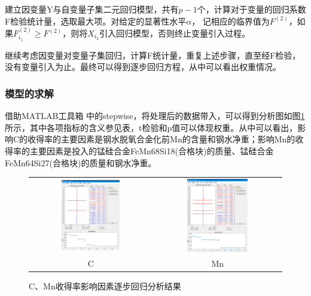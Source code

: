 \documentclass[12pt]{article}%
\begin{document}
建立因变量Y与自变量子集二元回归模型，共有$p-1$个，计算对于变量的回归系数F检验统计量，选取最大项。对给定的显著性水平$\alpha$，
记相应的临界值为$F^{(2)}$，如果$F^{(2)}_{i_1}\geq F^{(2)}$，则将$X_{i_2}$引入回归模型，否则终止变量引入过程。

继续考虑因变量对变量子集回归，计算F统计量，重复上述步骤，直至经F检验，没有变量引入为止。最终可以得到逐步回归方程，从中可以看出权重情况。
\subsubsection{模型的求解}
借助MATLAB工具箱 中的stepwise，将处理后的数据带入，可以得到分析图如图\ref{zhubuhuiguifenxi}所示，其中各项指标的含义参见表，t检验和p值可以体现权重。从中可以看出，影响C的收得率的主要因素是钢水脱氧合金化前Mn的含量和钢水净重；影响Mn的收得率的主要因素是投入的锰硅合金FeMn68Si18(合格块)的质量、锰硅合金FeMn64Si27(合格块)的质量和钢水净重。
 \begin{figure}
  \centering
  \begin{tabular}{cc}
  \includegraphics[width=0.5\textwidth]{picture/PPT3} & \includegraphics[width=0.5\textwidth]{picture/PPT4} \\
    C & Mn \\
  \end{tabular}
  \caption{C、Mn收得率影响因素逐步回归分析结果}\label{zhubuhuiguifenxi}
\end{figure}
\end{document}
